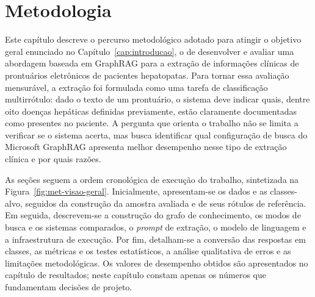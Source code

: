 \chapter{Metodologia}\label{cap:metodologia}

Este capítulo descreve o percurso metodológico adotado para atingir o objetivo geral enunciado no Capítulo~\ref{cap:introducao}, o de desenvolver e avaliar uma abordagem baseada em GraphRAG para a extração de informações clínicas de prontuários eletrônicos de pacientes hepatopatas. Para tornar essa avaliação mensurável, a extração foi formulada como uma tarefa de classificação multirrótulo: dado o texto de um prontuário, o sistema deve indicar quais, dentre oito doenças hepáticas definidas previamente, estão claramente documentadas como presentes no paciente. A pergunta que orienta o trabalho não se limita a verificar se o sistema acerta, mas busca identificar qual configuração de busca do Microsoft GraphRAG apresenta melhor desempenho nesse tipo de extração clínica e por quais razões.

As seções seguem a ordem cronológica de execução do trabalho, sintetizada na Figura~\ref{fig:met-visao-geral}. Inicialmente, apresentam-se os dados e as classes-alvo, seguidos da construção da amostra avaliada e de seus rótulos de referência. Em seguida, descrevem-se a construção do grafo de conhecimento, os modos de busca e os sistemas comparados, o \textit{prompt} de extração, o modelo de linguagem e a infraestrutura de execução. Por fim, detalham-se a conversão das respostas em classes, as métricas e os testes estatísticos, a análise qualitativa de erros e as limitações metodológicas. Os valores de desempenho obtidos são apresentados no capítulo de resultados; neste capítulo constam apenas os números que fundamentam decisões de projeto.

